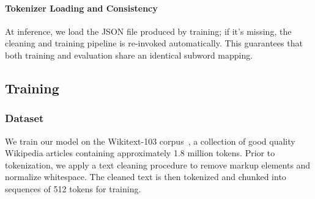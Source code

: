 \paragraph{Tokenizer Loading and Consistency}
At inference, we load the JSON file produced by training; if it's missing, the cleaning and training pipeline is re-invoked automatically. This guarantees that both training and evaluation share an identical subword mapping.
\subsection{Training}
\subsubsection{Dataset}
We train our model on the Wikitext-103 corpus~\cite{merity2016pointer}, a collection of good quality Wikipedia articles containing approximately 1.8 million tokens. Prior to tokenization, we apply a text cleaning procedure to remove markup elements and normalize whitespace. The cleaned text is then tokenized and chunked into sequences of 512 tokens for training.
